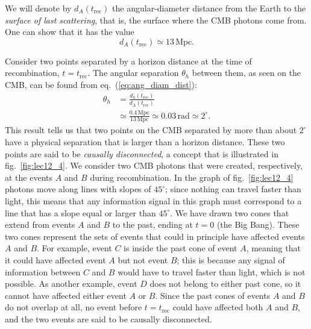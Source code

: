 \documentclass[11pt, a4paper,oneside,openright]{book}
\numberwithin{equation}{section}
\begin{document}
We will denote by $d_A(t_{\mathrm{rec}})$ the angular-diameter distance from the Earth to the {\it surface of last scattering}, that is, the surface where the CMB photons come from. One can show that it has the value
\begin{equation}
d_A(t_{\mathrm{rec}})\simeq 13\,{\mathrm{Mpc}}.
\end{equation}

Consider two points separated by a horizon distance at the time of recombination, $t=t_{\mathrm{rec}}$. The angular separation $\theta_h$ between them, as seen on the CMB, can be found from eq.\ (\ref{eq:ang_diam_dist}):
\begin{equation} \label{eq:horizon_prob1}
\begin{split}
\theta_h&=\frac{d_h(t_{\mathrm{rec}})}{d_A(t_{\mathrm{rec}})}\\
&\simeq \frac{0.4\,{\mathrm{Mpc}}}{13\,{\mathrm{Mpc}}}\simeq 0.03\,{\mathrm{rad}}\simeq 2^{\circ}.
\end{split}
\end{equation}
This result tells us that two points on the CMB separated by more than about $2^{\circ}$ have a physical separation that is larger than a horizon distance. These two points are said to be {\it causally disconnected}, a concept that is illustrated in fig.\ \ref{fig:lec12_4}. We consider two CMB photons that were created, respectively, at the events $A$ and $B$ during recombination. In the graph of fig.\ \ref{fig:lec12_4} photons move along lines with slopes of $45^{\circ}$; since nothing can travel faster than light, this means that any information signal in this graph must correspond to a line that has a slope equal or larger than $45^{\circ}$. We have drawn two cones that extend from events $A$ and $B$ to the past, ending at $t=0$ (the Big Bang). These two cones represent the sets of events that could in principle have affected events $A$ and $B$. For example, event $C$ is inside the past cone of event $A$, meaning that it could have affected event $A$ but not event $B$; this is because any signal of information between $C$ and $B$ would have to travel faster than light, which is not possible. As another example, event $D$ does not belong to either past cone, so it cannot have affected either event $A$ or $B$. Since the past cones of events $A$ and $B$ do not overlap at all, no event before $t=t_{\mathrm{rec}}$ could have affected both $A$ and $B$, and the two events are said to be causally disconnected.
\end{document}
